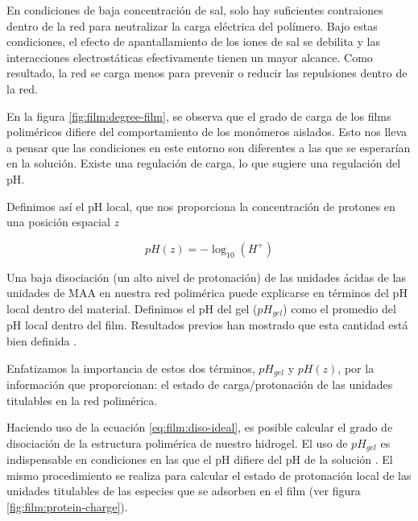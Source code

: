 En condiciones de baja concentraci\'on de sal, solo hay suficientes contraiones dentro de la red para neutralizar la carga el\'ectrica del pol\'imero. Bajo estas condiciones, el efecto de apantallamiento de los iones de sal se debilita y las interacciones electrost\'aticas efectivamente tienen un mayor alcance. Como resultado, la red se carga menos para prevenir o reducir las repulsiones dentro de la red.

En la figura \ref{fig:film:degree-film}, se observa que el grado de carga de los films polim\'ericos difiere del comportamiento de los mon\'omeros aislados. Esto nos lleva a pensar que las condiciones en este entorno son diferentes a las que se esperar\'ian en la soluci\'on. Existe una regulaci\'on de carga, lo que sugiere una regulaci\'on del pH.

Definimos as\'i el pH local, que nos proporciona la concentración de protones en una posición espacial $z$

\begin{equation}
	pH(z) = -\log_{10}(H^+)
	\label{eq:film:pH-local}
\end{equation}

Una baja disociaci\'on (un alto nivel de protonaci\'on) de las unidades \'acidas de las unidades de MAA en nuestra red polim\'erica puede explicarse en t\'erminos del pH local dentro del material. Definimos el pH del gel ($pH_{gel}$) como el promedio del pH local dentro del film. Resultados previos han mostrado que esta cantidad est\'a bien definida \cite{longo2014non}.

Enfatizamos la importancia de estos dos t\'erminos, $pH_{gel}$ y $pH(z)$, por la informaci\'on que proporcionan: el estado de carga/protonaci\'on de las unidades titulables en la red polim\'erica.

Haciendo uso de la ecuaci\'on \ref{eq:film:diso-ideal}, es posible calcular el grado de disociaci\'on de la estructura polim\'erica de nuestro hidrogel. El uso de $pH_{gel}$ es indispensable en condiciones en las que el pH difiere del pH de la soluci\'on . El mismo procedimiento se realiza para calcular el estado de protonaci\'on local de las unidades titulables de las especies que se adsorben en el film (ver figura \ref{fig:film:protein-charge}).



